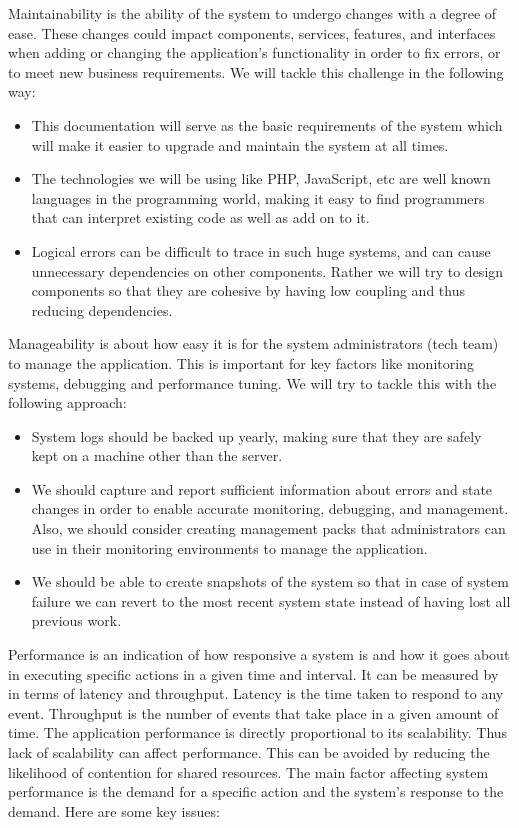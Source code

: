 \documentclass[11pt]{article}
\begin{document}
		Maintainability is the ability of the system to undergo changes with a degree of ease. These changes could impact components, services, features, and interfaces when adding or changing the application’s functionality in order to fix errors, or to meet new business requirements. We will tackle this challenge in the following way:
		\begin{itemize}
			\item This documentation will serve as the basic requirements of the system which will make it easier to upgrade and maintain the system at all times.
			
			\item The technologies we will be using like PHP, JavaScript, etc are well known languages in the programming world, making it easy to find programmers that can interpret existing code as well as add on to it.
			
			\item Logical errors can be difficult to trace in such huge systems, and can cause unnecessary dependencies on other components. Rather we will try to design components so that they are cohesive by having low coupling and thus reducing dependencies.
		\end{itemize}
		
			Manageability is about how easy it is for the system administrators (tech team) to manage the application. This is important for key factors like monitoring systems, debugging and performance tuning. We will try to tackle this with the following approach:
			\begin{itemize}
				\item System logs should be backed up yearly, making sure that they are safely kept on a machine other than the server.
				
				\item We should capture and report sufficient information about errors and state changes in order to enable accurate monitoring, debugging, and management. Also, we should consider creating management packs that administrators can use in their monitoring environments to manage the application.
				
				\item We should be able to create snapshots of the system so that in case of system failure we can revert to the most recent system state instead of having lost all previous work.
			\end{itemize}
			
			Performance is an indication of how responsive a system is and how it goes about in executing specific actions in a given time and interval. It can be measured by in terms of latency and throughput. Latency is the time taken to respond to any event. Throughput is the number of events that take place in a given amount of time. The application performance is directly proportional to its scalability. Thus lack of scalability can affect performance. This can be avoided by reducing the likelihood of contention for shared resources. The main factor affecting system performance is the demand for a specific action and the system’s response to the demand. Here are some key issues:
\end{document}
